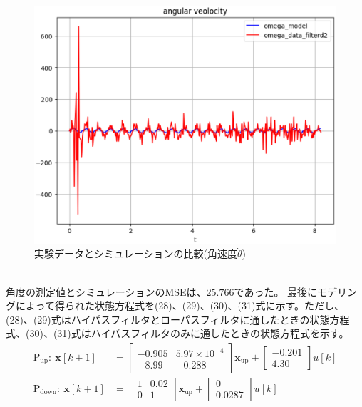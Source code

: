 \documentclass[a4paper,10.5pt]{ltjsarticle}
\begin{document}
\begin{figure}[h]
  \centering
  \includegraphics[scale=0.7]{figure12.eps}
  \caption{実験データとシミュレーションの比較(角速度$\dot{\theta}$)}
  \label{fig:figure12}
\end{figure}\\
角度の測定値とシミュレーションのMSEは、$25.766$であった。
\clearpage
最後にモデリングによって得られた状態方程式を(28)、(29)、(30)、(31)式に示す。ただし、(28)、(29)式はハイパスフィルタとローパスフィルタに通したときの状態方程式、(30)、(31)式はハイパスフィルタのみに通したときの状態方程式を示す。
\begin{align}
  \mathrm{P_{up}}:\ \bm x[k+1]&=
  \begin{bmatrix}
    -0.905&5.97\times 10^{-4}\\
    -8.99&-0.288
  \end{bmatrix}\bm
  x_\mathrm{up}+
  \begin{bmatrix}
    -0.201\\
    4.30
  \end{bmatrix}
  u[k]\\[10pt]
  \mathrm{P_{down}}:\ \bm x[k+1]&=
  \begin{bmatrix}
    1&0.02\\
    0&1
  \end{bmatrix}
  \bm x_\mathrm{up}+
  \begin{bmatrix}
    0\\
    0.0287
  \end{bmatrix}
  u[k]
\end{align}
\end{document}
